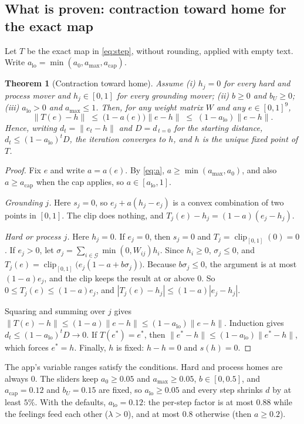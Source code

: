 \documentclass[10pt]{article}
\newtheorem{theorem}{Theorem}
\theoremstyle{definition}
\theoremstyle{remark}
\newcommand{\clip}{\operatorname{clip}_{[0,1]}}
\newcommand{\norm}[1]{\lVert #1\rVert}
\begin{document}
\subsection{What is proven: contraction toward home for the exact map}
Let $T$ be the exact map in \eqref{eq:step}, without rounding, applied with empty text. Write $a_{\mathrm{lo}} = \min(a_0, a_{\max}, a_{\mathrm{cap}})$.

\begin{theorem}[Contraction toward home]
\label{thm:contract}
Assume (i) $h_j=0$ for every hard and process mover and $h_j\in[0,1]$ for every grounding mover; (ii) $b\ge0$ and $b_U\ge0$; (iii) $a_{\mathrm{lo}}>0$ and $a_{\max}\le1$. Then, for any weight matrix $W$ and any $e\in[0,1]^9$,
\begin{equation}
\norm{T(e)-h} \;\le\; \bigl(1-a(e)\bigr)\norm{e-h} \;\le\; (1-a_{\mathrm{lo}})\norm{e-h}.
\end{equation}
Hence, writing $d_t=\norm{e_t-h}$ and $D=d_{\,t=0}$ for the starting distance, $d_t\le(1-a_{\mathrm{lo}})^t D$, the iteration converges to $h$, and $h$ is the unique fixed point of $T$.
\end{theorem}

\begin{proof}
Fix $e$ and write $a=a(e)$. By \eqref{eq:a}, $a\ge\min(a_{\max},a_0)$, and also $a\ge a_{\mathrm{cap}}$ when the cap applies, so $a\in[a_{\mathrm{lo}},1]$.

\emph{Grounding $j$.} Here $s_j=0$, so $e_j+a(h_j-e_j)$ is a convex combination of two points in $[0,1]$. The clip does nothing, and $T_j(e)-h_j=(1-a)(e_j-h_j)$.

\emph{Hard or process $j$.} Here $h_j=0$. If $e_j=0$, then $s_j=0$ and $T_j=\clip(0)=0$. If $e_j>0$, let $\sigma_j=\sum_{i\in\mathcal{G}}\min(0,W_{ij})h_i$. Since $h_i\ge0$, $\sigma_j\le0$, and $T_j(e)=\clip\bigl(e_j(1-a+b\sigma_j)\bigr)$. Because $b\sigma_j\le0$, the argument is at most $(1-a)e_j$, and the clip keeps the result at or above $0$. So $0\le T_j(e)\le(1-a)e_j$, and $|T_j(e)-h_j|\le(1-a)|e_j-h_j|$.

Squaring and summing over $j$ gives $\norm{T(e)-h}\le(1-a)\norm{e-h}\le(1-a_{\mathrm{lo}})\norm{e-h}$. Induction gives $d_t\le(1-a_{\mathrm{lo}})^t D\to0$. If $T(e^\ast)=e^\ast$, then $\norm{e^\ast-h}\le(1-a_{\mathrm{lo}})\norm{e^\ast-h}$, which forces $e^\ast=h$. Finally, $h$ is fixed: $h-h=0$ and $s(h)=0$.
\end{proof}

The app's variable ranges satisfy the conditions. Hard and process homes are always $0$. The sliders keep $a_0\ge0.05$ and $a_{\max}\ge0.05$, $b\in[0,0.5]$, and $a_{\mathrm{cap}}=0.12$ and $b_U=0.15$ are fixed, so $a_{\mathrm{lo}}\ge0.05$ and every step shrinks $d$ by at least $5\%$. With the defaults, $a_{\mathrm{lo}}=0.12$: the per-step factor is at most $0.88$ while the feelings feed each other ($\lambda>0$), and at most $0.8$ otherwise (then $a\ge0.2$).
\end{document}

